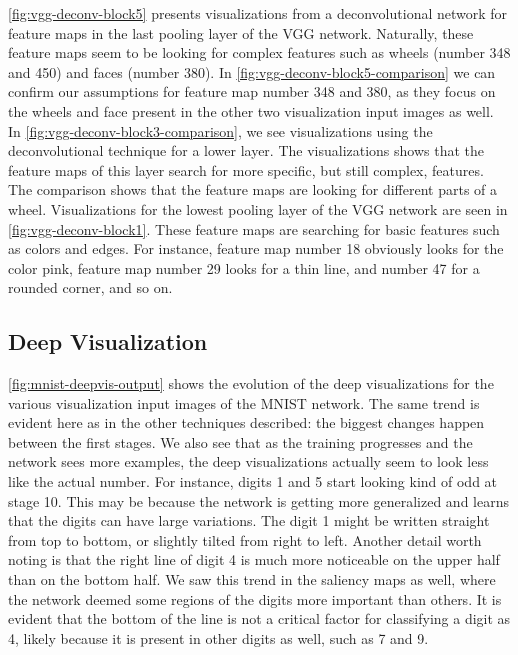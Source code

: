 \noindent \autoref{fig:vgg-deconv-block5} presents visualizations from a deconvolutional network for feature maps in the last pooling layer of the VGG network. Naturally, these feature maps seem to be looking for complex features such as wheels (number 348 and 450) and faces (number 380). In \autoref{fig:vgg-deconv-block5-comparison} we can confirm our assumptions for feature map number 348 and 380, as they focus on the wheels and face present in the other two visualization input images as well. \\

\noindent In \autoref{fig:vgg-deconv-block3-comparison}, we see visualizations using the deconvolutional technique for a lower layer. The visualizations shows that the feature maps of this layer search for more specific, but still complex, features. The comparison shows that the feature maps are looking for different parts of a wheel. Visualizations for the lowest pooling layer of the VGG network are seen in \autoref{fig:vgg-deconv-block1}. These feature maps are searching for basic features such as colors and edges. For instance, feature map number 18 obviously looks for the color pink, feature map number 29 looks for a thin line, and number 47 for a rounded corner, and so on. 

\subsection{Deep Visualization}

\autoref{fig:mnist-deepvis-output} shows the evolution of the deep visualizations for the various visualization input images of the MNIST network. The same trend is evident here as in the other techniques described: the biggest changes happen between the first stages. We also see that as the training progresses and the network sees more examples, the deep visualizations actually seem to look less like the actual number. For instance, digits 1 and 5 start looking kind of odd at stage 10. This may be because the network is getting more generalized and learns that the digits can have large variations. The digit 1 might be written straight from top to bottom, or slightly tilted from right to left. Another detail worth noting is that the right line of digit 4 is much more noticeable on the upper half than on the bottom half. We saw this trend in the saliency maps as well, where the network deemed some regions of the digits more important than others. It is evident that the bottom of the line is not a critical factor for classifying a digit as 4, likely because it is present in other digits as well, such as 7 and 9.\\

